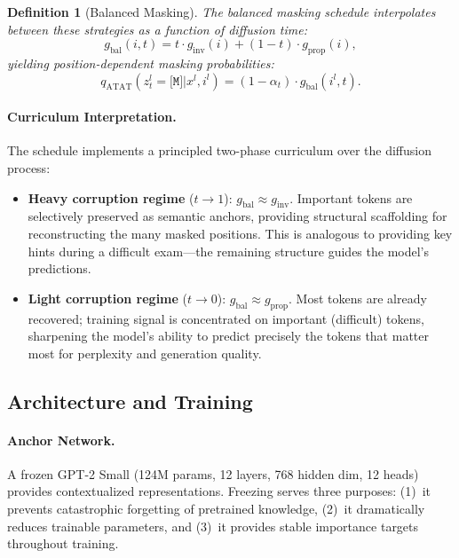 \documentclass[11pt]{article}
\newtheorem{definition}[theorem]{Definition}
\theoremstyle{remark}
\begin{document}
\begin{definition}[Balanced Masking]
The balanced masking schedule interpolates between these strategies as a function of diffusion time:
\begin{equation}
\label{eq:balanced}
    g_{\text{bal}}(i,t) = t \cdot g_{\text{inv}}(i) + (1{-}t) \cdot g_{\text{prop}}(i),
\end{equation}
yielding position-dependent masking probabilities:
\begin{equation}
    q_{\text{ATAT}}(z_t^l{=}\texttt{[M]}|x^l,i^l) = (1{-}\alpha_t) \cdot g_{\text{bal}}(i^l,t).
\end{equation}
\end{definition}

\paragraph{Curriculum Interpretation.} The schedule implements a principled two-phase curriculum over the diffusion process:
\begin{itemize}[leftmargin=*,itemsep=1pt,topsep=2pt]
    \item \textbf{Heavy corruption regime} ($t \to 1$): $g_{\text{bal}} \approx g_{\text{inv}}$. Important tokens are selectively preserved as semantic anchors, providing structural scaffolding for reconstructing the many masked positions. This is analogous to providing key hints during a difficult exam---the remaining structure guides the model's predictions.
    \item \textbf{Light corruption regime} ($t \to 0$): $g_{\text{bal}} \approx g_{\text{prop}}$. Most tokens are already recovered; training signal is concentrated on important (difficult) tokens, sharpening the model's ability to predict precisely the tokens that matter most for perplexity and generation quality.
\end{itemize}


\subsection{Architecture and Training}
\label{sec:arch}

\paragraph{Anchor Network.} A frozen GPT-2 Small (124M params, 12 layers, 768 hidden dim, 12 heads) provides contextualized representations. Freezing serves three purposes: (1)~it prevents catastrophic forgetting of pretrained knowledge, (2)~it dramatically reduces trainable parameters, and (3)~it provides stable importance targets throughout training.
\end{document}
